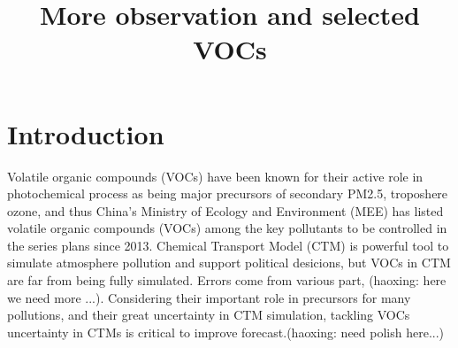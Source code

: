 \documentclass{ametsocV6.1}
\title{More observation and selected VOCs}
\affiliation{\aff{a}{Nanjing University}}
\begin{document}
\maketitle

%
%
%
%
%
%

%


\section{Introduction}
Volatile organic compounds (VOCs) have been known for their active role in photochemical process as being major precursors of secondary PM2.5, troposhere ozone\citep{Wu_2018}, and thus China's Ministry of Ecology and Environment (MEE) has listed volatile organic compounds (VOCs) among the key pollutants to be controlled in the series plans since 2013. Chemical Transport Model (CTM) is powerful tool to simulate atmosphere pollution and support political desicions, but VOCs in CTM are far from being fully simulated. Errors come from various part, (haoxing: here we need more ...). Considering their important role in precursors for many pollutions, and their great uncertainty in CTM simulation, tackling VOCs uncertainty in CTMs is critical to improve forecast.(haoxing: need polish here...)
\end{document}
